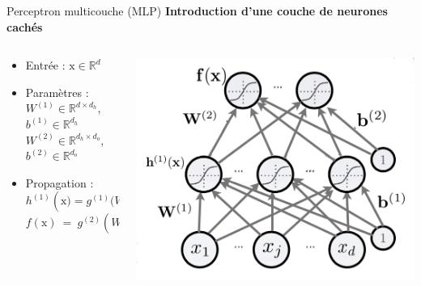 \documentclass[french]{beamer}
\begin{document}
\begin{frame}{Perceptron multicouche (MLP)}
\textbf{Introduction d'une couche de neurones cachés}

\begin{columns}[T]
\begin{column}{.48\textwidth}
\begin{itemize}
	\item Entrée : $\mathrm{x} \in \mathbb{R}^d$
	\item Paramètres : \\ $W^{(1)} \in \mathbb{R}^{d\times d_h}$, $b^{(1)} \in \mathbb{R}^{d_h}$ \\ $W^{(2)} \in \mathbb{R}^{d_h \times d_o}$, $b^{(2)} \in \mathbb{R}^{d_o}$
	\item Propagation : \\ {\small $h^{(1)}\left(\mathrm{x}) = g^{(1)}(W^{(1), T}\mathrm{x} + b^{(1)}\right)$} \\ {\small$f(\mathrm{x})~=~g^{(2)}\left(W^{(2), T} h^{(1)}(\mathrm{x})~+~b^{(2)}\right)$}
\end{itemize}
\end{column}
\hfill
\begin{column}{.48\textwidth}
\includegraphics[width=\textwidth]{figures/nn}
\end{column}
\end{columns}
\end{frame}
\end{document}
